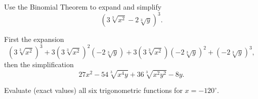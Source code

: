 \documentclass[12pt,addpoints, answers, fleqn]{exam}
\begin{document}
\begin{questions}
\question Use the Binomial Theorem to expand and simplify
\[
\left( 3\sqrt[3]{x^2} - 2\sqrt[3]{y}\right)^3.
\]
\begin{solution} First the expansion
\[
\boxed{\left( 3\sqrt[3]{x^2} \right)^3
+
3 \left( 3\sqrt[3]{x^2} \right)^2\left( - 2\sqrt[3]{y} \right)
+
3 \left( 3\sqrt[3]{x^2} \right)\left( - 2\sqrt[3]{y} \right)^2
+
 \left( - 2\sqrt[3]{y} \right)^3},
\]
then the simplification
\[
\boxed{ 27x^2 - 54 \sqrt[3]{x^4y} + 36 \sqrt[3]{x^2y^2} - 8y}.
\]
\end{solution}


\question Evaluate (exact values) all six trigonometric functions for $x = -120^\circ$.
\end{questions}
\end{document}
